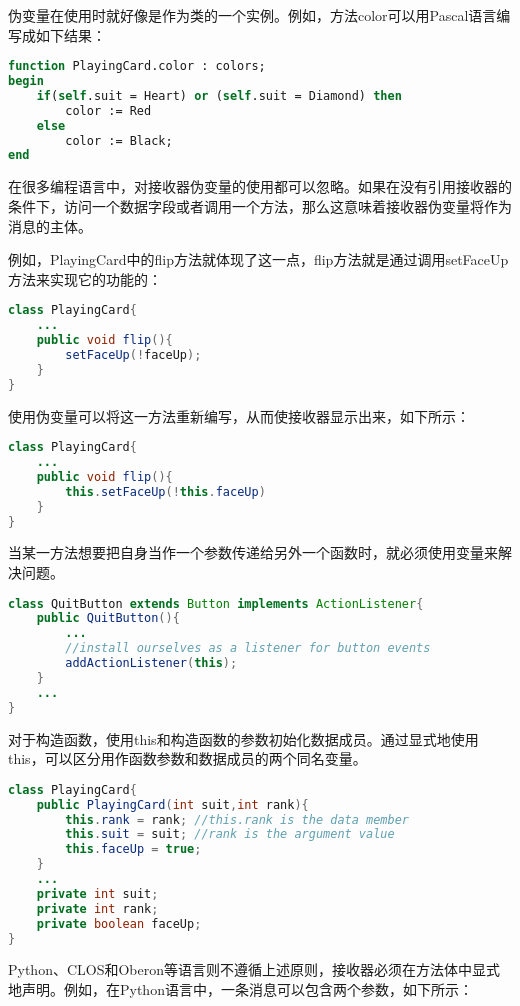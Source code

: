 伪变量在使用时就好像是作为类的一个实例。例如，方法color可以用Pascal语言编写成如下结果：

\begin{lstlisting}[language=Pascal]
function PlayingCard.color : colors;
begin
	if(self.suit = Heart) or (self.suit = Diamond) then
		color := Red
	else
		color := Black;
end
\end{lstlisting}

在很多编程语言中，对接收器伪变量的使用都可以忽略。如果在没有引用接收器的条件下，访问一个数据字段或者调用一个方法，那么这意味着接收器伪变量将作为消息的主体。

例如，PlayingCard中的flip方法就体现了这一点，flip方法就是通过调用setFaceUp方法来实现它的功能的：



\begin{lstlisting}[language=Java]
class PlayingCard{
	...
	public void flip(){
		setFaceUp(!faceUp);
	}
}
\end{lstlisting}

使用伪变量可以将这一方法重新编写，从而使接收器显示出来，如下所示：



\begin{lstlisting}[language=Java]
class PlayingCard{
	...
	public void flip(){
		this.setFaceUp(!this.faceUp)
	}
}
\end{lstlisting}

当某一方法想要把自身当作一个参数传递给另外一个函数时，就必须使用变量来解决问题。



\begin{lstlisting}[language=Java]
class QuitButton extends Button implements ActionListener{
	public QuitButton(){
		...
		//install ourselves as a listener for button events
		addActionListener(this);
	}
	...
}
\end{lstlisting}

对于构造函数，使用this和构造函数的参数初始化数据成员。通过显式地使用this，可以区分用作函数参数和数据成员的两个同名变量。


\begin{lstlisting}[language=Java]
class PlayingCard{
	public PlayingCard(int suit,int rank){
		this.rank = rank; //this.rank is the data member
		this.suit = suit; //rank is the argument value
		this.faceUp = true;
	}
	...
	private int suit;
	private int rank;
	private boolean faceUp;
}
\end{lstlisting}

Python、CLOS和Oberon等语言则不遵循上述原则，接收器必须在方法体中显式地声明。例如，在Python语言中，一条消息可以包含两个参数，如下所示：





